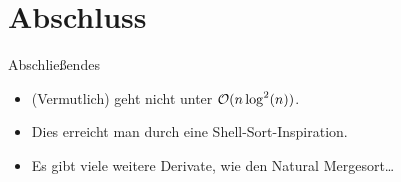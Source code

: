 \section{Abschluss}
\begin{frame}{Abschließendes}
\begin{itemize}[<+(1)->]
    \itemsep12pt
    \item (Vermutlich) geht nicht unter \(\mathcal{O}(n \log^2(n))\).
    \item Dies erreicht man durch eine Shell-Sort-Inspiration.
    \item Es gibt viele weitere Derivate, wie den Natural Mergesort\ldots
\end{itemize}
\end{frame}
\SidebarReset


